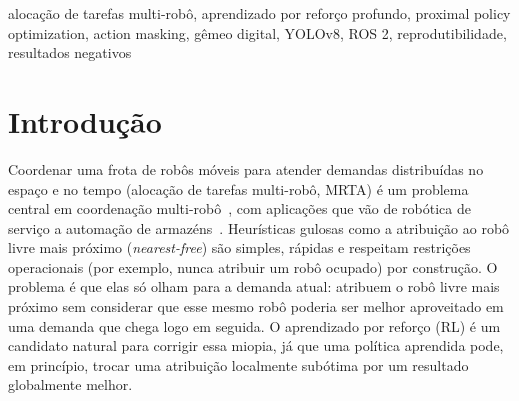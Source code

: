 \documentclass[conference]{IEEEtran}
\begin{document}
\begin{abstract}
A alocação de tarefas multi-robô (MRTA) costuma ser resolvida com heurísticas gulosas, rápidas mas incapazes de antecipar demandas futuras. Treinamos um agente de aprendizado por reforço (RL, Proximal Policy Optimization, PPO) para essa tarefa, com observações baseadas em um gêmeo digital por câmera: uma câmera cenital e um detector YOLOv8n localizam uma frota de robôs TurtleBot3 com erro médio de rastreamento de 4,7 cm (mAP em IoU 0,5 de 0,995), substituindo a odometria bruta como fonte de posição da política de alocação. Comparamos o PPO contra a heurística gulosa \textit{nearest-free} usando testes estatísticos pareados sobre 1000 episódios. Contrariando nossa hipótese, o PPO não superou o nearest-free: o tempo médio de resposta ficou cerca de 12\% pior, uma diferença estatisticamente significativa. O PPO atribui tarefas a robôs ocupados em 4,2\% das decisões, contra 0,3\% do nearest-free, sugerindo que a penalidade de treino não bastou para ensinar essa restrição. Testamos essa explicação com \textit{action masking}, que impede a política de escolher robôs ocupados por construção: a taxa de atribuição inválida caiu para 0\%, mas o tempo de resposta continuou cerca de 11\% pior que o nearest-free. A violação de restrição, portanto, não é a causa dominante da diferença, que atribuímos ao espaço de ação reduzido ($N=3$) e ao orçamento de treino. Reportamos este resultado negativo junto com o experimento que refutou nossa própria explicação para ele, já que uma hipótese testada e falseada é mais informativa do que uma alegação positiva não testada.
\end{abstract}

\begin{IEEEkeywords}
alocação de tarefas multi-robô, aprendizado por reforço profundo, proximal policy optimization, action masking, gêmeo digital, YOLOv8, ROS 2, reprodutibilidade, resultados negativos
\end{IEEEkeywords}

\section{Introdução}

Coordenar uma frota de robôs móveis para atender demandas distribuídas no espaço e no tempo (alocação de tarefas multi-robô, MRTA) é um problema central em coordenação multi-robô~\cite{gerkey2004formal}, com aplicações que vão de robótica de serviço a automação de armazéns~\cite{agrawal2022dcmrta,pal2025together}. Heurísticas gulosas como a atribuição ao robô livre mais próximo (\textit{nearest-free}) são simples, rápidas e respeitam restrições operacionais (por exemplo, nunca atribuir um robô ocupado) por construção. O problema é que elas só olham para a demanda atual: atribuem o robô livre mais próximo sem considerar que esse mesmo robô poderia ser melhor aproveitado em uma demanda que chega logo em seguida. O aprendizado por reforço (RL) é um candidato natural para corrigir essa miopia, já que uma política aprendida pode, em princípio, trocar uma atribuição localmente subótima por um resultado globalmente melhor.
\end{document}

